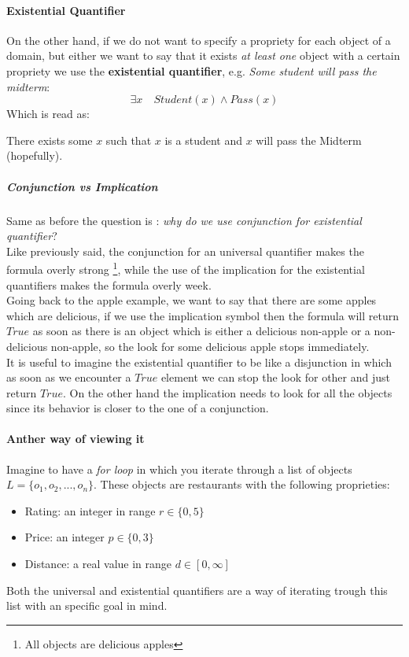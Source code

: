 \documentclass[10pt,a4paper]{article}
\newcommand{\braces}[1]{%
  \lbrace{#1}\rbrace}
\begin{document}
\paragraph{Existential Quantifier}
On the other hand, if we do not want to specify a propriety for each object of a domain, but either we want to say that it exists \textit{at least one} object with a certain propriety we use the \textbf{existential quantifier}, e.g. \textit{Some student will pass the midterm}:
\[\exists x\quad Student(x) \wedge Pass(x)\]
Which is read as:
\begin{center}
There exists some $x$ such that $x$ is a student and $x$ will pass the Midterm (hopefully).
\end{center} 


\subparagraph{Conjunction vs Implication}
Same as before the question is : \textit{why do we use conjunction for existential quantifier}?\\
Like previously said, the conjunction for an universal quantifier makes the formula overly strong \footnote{All objects are delicious apples}, while the use of the implication for the existential quantifiers makes the formula overly week.\\
Going back to the apple example, we want to say that there are some apples which are delicious, if we use the implication symbol then the formula will return $True$ as soon as there is an object which is either a delicious non-apple or a non-delicious non-apple, so the look for some delicious apple stops immediately.\\
It is useful to imagine the existential quantifier to be like a disjunction in which as soon as we encounter a $True$ element we can stop the look for other and just return $True$.
On the other hand the implication needs to look for all the objects since its behavior is closer to the one of a conjunction.

\paragraph{Anther way of viewing it}
Imagine to have a \textit{for loop} in which you iterate through a list of objects $L=\lbrace o_1,o_2,...,o_n\rbrace$.  These objects are restaurants with the following proprieties:
\begin{itemize}
\item Rating: an integer in range $r \in \braces{0,5}$
\item Price: an integer $p \in \braces{0,3}$
\item Distance: a real value in range $d \in [0,\infty]$
\end{itemize}
Both the universal and existential quantifiers are a way of iterating trough this list with an specific goal in mind.
\end{document}
